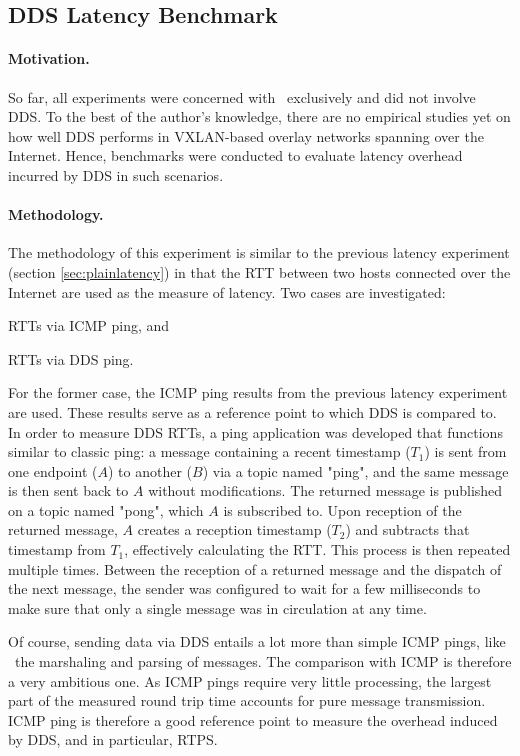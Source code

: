 \subsection{DDS Latency Benchmark} \label{sec:ddslatency}

\paragraph{Motivation.} So far, all experiments were concerned with \wnet\ exclusively and did not involve DDS. To the best of the author's knowledge, there are no empirical studies yet on how well DDS performs in VXLAN-based overlay networks spanning over the Internet. Hence, benchmarks were conducted to evaluate latency overhead incurred by DDS in such scenarios.

\paragraph{Methodology.} The methodology of this experiment is similar to the previous latency experiment (section \ref{sec:plainlatency}) in that the RTT between two hosts connected over the Internet are used as the measure of latency. Two cases are investigated: 
\begin{inparaenum}[(i)]
	\item RTTs via ICMP ping, and
	\item RTTs via DDS ping.
\end{inparaenum}
For the former case, the ICMP ping results from the previous latency experiment are used. These results serve as a reference point to which DDS is compared to. In order to measure DDS RTTs, a ping application was developed that functions similar to classic ping: a message containing a recent timestamp ($T_1$) is sent from one endpoint ($A$) to another ($B$) via a topic named "ping", and the same message is then sent back to $A$ without modifications. The returned message is published on a topic named "pong", which $A$ is subscribed to. Upon reception of the returned message, $A$ creates a reception timestamp ($T_2$) and subtracts that timestamp from $T_1$, effectively calculating the RTT. This process is then repeated multiple times. Between the reception of a returned message and the dispatch of the next message, the sender was configured to wait for a few milliseconds to make sure that only a single message was in circulation at any time.

Of course, sending data via DDS entails a lot more than simple ICMP pings, like \eg\ the marshaling and parsing of messages. The comparison with ICMP is therefore a very ambitious one. As ICMP pings require very little processing, the largest part of the measured round trip time accounts for pure message transmission. ICMP ping is therefore a good reference point to measure the overhead induced by DDS, and in particular, RTPS. 

